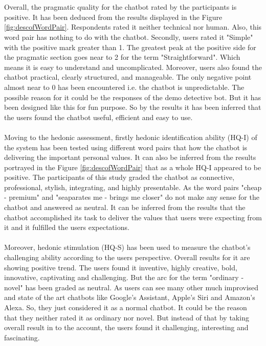 \\~\\
Overall, the pragmatic quality for the chatbot rated by the participants is positive. It has been deduced from the results displayed in the Figure \ref{fig:descofWordPair}. Respondents rated it neither technical nor human. Also, this word pair has nothing to do with the chatbot. Secondly, users rated it "Simple" with the positive mark greater than 1. The greatest peak at the positive side for the pragmatic section goes near to 2 for the term "Straightforward". Which means it is easy to understand and uncomplicated. Moreover, users also found the chatbot practical, clearly structured, and manageable. The only negative point almost near to 0 has been encountered i.e. the chatbot is unpredictable. The possible reason for it could be the responses of the demo detective bot. But it has been designed like this for fun purpose. So by the results it has been inferred that the users found the chatbot useful, efficient and easy to use.
\\~\\
Moving to the hedonic assessment, firstly hedonic identification ability (HQ-I) of the system has been tested using different word pairs that how the chatbot is delivering the important personal values. It can also be inferred from the results portrayed in the Figure \ref{fig:descofWordPair} that as a whole HQ-I appeared to be positive. The participants of this study graded the chatbot as connective, professional, stylish, integrating, and highly presentable. As the word pairs "cheap - premium" and "seaparates me - brings me closer" do not make any sense for the chatbot and answered as neutral. It can be inferred from the results that the chatbot accomplished its task to deliver the values that users were expecting from it and it fulfilled the users expectations. 
\\~\\
Moreover, hedonic stimulation (HQ-S) has been used to measure the chatbot's challenging ability according to the users perspective. Overall results for it are showing positive trend. The users found it inventive, highly creative, bold, innovative, captivating and challenging. But the arc for the term "ordinary - novel" has been graded as neutral. As users can see many other much improvised and state of the art chatbots like Google's Assistant, Apple's Siri and Amazon's Alexa. So, they just considered it as a normal chatbot. It could be the reason that they neither rated it as ordinary nor novel. But instead of that by taking overall result in to the account, the users found it challenging, interesting and fascinating.
